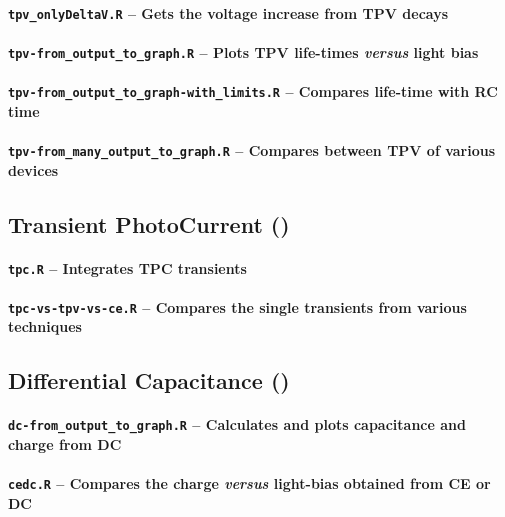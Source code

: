 				\paragraph{\texttt{tpv\_onlyDeltaV.R} -- Gets the voltage increase from TPV decays}
				
		\paragraph{\texttt{tpv-from\_output\_to\_graph.R} -- Plots TPV life\hyp{}times \textsl{versus} light bias}
		
		
\paragraph{\texttt{tpv-from\_output\_to\_graph-with\_limits.R} -- Compares life\hyp{}time with RC time}

		\paragraph{\texttt{tpv-from\_many\_output\_to\_graph.R} -- Compares between TPV of various devices}

	\subsection{Transient PhotoCurrent ()}\label{r_tpc}

		\paragraph{\texttt{tpc.R} -- Integrates TPC transients}
		\paragraph{\texttt{tpc-vs-tpv-vs-ce.R} -- Compares the single transients from various techniques}


	\subsection{Differential Capacitance ()}\label{r_dc}

		\paragraph{\texttt{dc-from\_output\_to\_graph.R} -- Calculates and plots capacitance and charge from DC}
		
		\paragraph{\texttt{cedc.R} -- Compares the charge \textsl{versus} light\hyp{}bias obtained from CE or DC}
		
